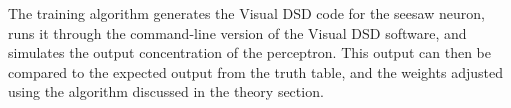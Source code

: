The training algorithm generates the Visual DSD code for the seesaw neuron, runs it through the command-line version of the Visual DSD software, and simulates the output concentration of the perceptron. This output can then be compared to the expected output from the truth table, and the weights adjusted using the algorithm discussed in the theory section.



